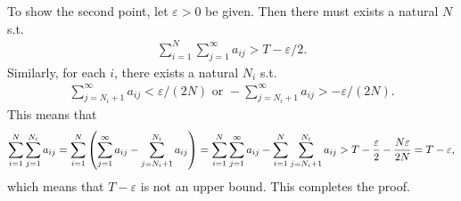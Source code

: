 \documentclass[12pt]{article}
\begin{document}
\begin{fproof}[3(b)]
 To show the second point, let \(\varepsilon > 0\) be given.
 Then there must exists a natural \(N\) s.t.
 \begin{align*}
    \sum_{i=1}^{N} \sum_{j=1}^{\infty} a_{ij} > T - \varepsilon/2.
 \end{align*}
 Similarly, for each \(i\), there exists a natural \(N_i\) s.t. 
 \begin{align*}
    \sum_{j=N_i+1}^{\infty} a_{ij} < \varepsilon/(2N) \text{ or } -\sum_{j=N_i+1}^{\infty} a_{ij} > -\varepsilon/(2N).
 \end{align*}
 This means that
 \begin{align*}
    \sum_{i=1}^{N} \sum_{j=1}^{N_i} a_{ij} 
    = \sum_{i=1}^{N} \left( \sum_{j=1}^{\infty} a_{ij} - \sum_{j=N_i+1}^{N_i} a_{ij} \right) = \sum_{i=1}^{N}\sum_{j=1}^{\infty} a_{ij} - \sum_{i=1}^{N}\sum_{j=N_i+1}^{N_i} a_{ij} > T - \frac{\varepsilon}{2} -\frac{N \varepsilon}{2N} = T - \varepsilon,
 \end{align*}
 which means that \(T -\varepsilon\) is not an upper bound.
 This completes the proof.
\end{fproof}
\end{document}
